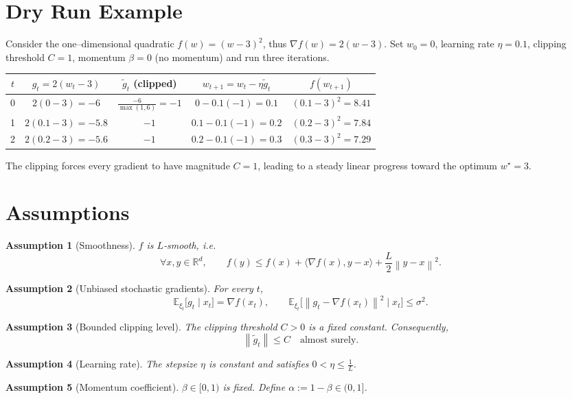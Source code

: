 \documentclass{article}
\newtheorem{assumption}{Assumption}
\newcommand{\EE}{\mathbb{E}}
\newcommand{\norm}[1]{\left\|#1\right\|}
\newcommand{\grad}{\nabla}
\begin{document}
\section*{Dry Run Example}
Consider the one–dimensional quadratic $f(w)=(w-3)^2$, thus $\grad f(w)=2(w-3)$.  
Set $w_0=0$, learning rate $\eta=0.1$, clipping threshold $C=1$, momentum $\beta=0$ (no momentum) and run three iterations.

\begin{center}
\begin{tabular}{c|c|c|c|c}
$t$ & $g_t=2(w_t-3)$ & $\tilde g_t$ (clipped) & $w_{t+1}=w_t-\eta\tilde g_t$ & $f(w_{t+1})$\\\hline
0 & $2(0-3)=-6$ & $\displaystyle\frac{-6}{\max(1,6)}=-1$ & $0-0.1(-1)=0.1$ & $(0.1-3)^2=8.41$\\
1 & $2(0.1-3)=-5.8$ & $-1$ & $0.1-0.1(-1)=0.2$ & $(0.2-3)^2=7.84$\\
2 & $2(0.2-3)=-5.6$ & $-1$ & $0.2-0.1(-1)=0.3$ & $(0.3-3)^2=7.29$
\end{tabular}
\end{center}
The clipping forces every gradient to have magnitude $C=1$, leading to a steady linear progress toward the optimum $w^\star=3$.

\newpage
\section*{Assumptions}
\begin{assumption}[Smoothness]\label{ass:smooth}
$f$ is $L$‑smooth, i.e.
\[
    \forall x,y\in\mathbb{R}^d,\qquad
    f(y)\le f(x)+\langle\grad f(x),y-x\rangle+\frac{L}{2}\norm{y-x}^2 .
\]
\end{assumption}
\begin{assumption}[Unbiased stochastic gradients]\label{ass:unbiased}
For every $t$,
\[
    \EE_{\xi_t}\!\bigl[g_t\mid x_t\bigr]=\grad f(x_t),\qquad 
    \EE_{\xi_t}\!\bigl[\norm{g_t-\grad f(x_t)}^2\mid x_t\bigr]\le\sigma^2 .
\]
\end{assumption}
\begin{assumption}[Bounded clipping level]\label{ass:clip}
The clipping threshold $C>0$ is a fixed constant. Consequently,
\[
    \norm{\tilde g_t}\le C\quad\text{almost surely.}
\]
\end{assumption}
\begin{assumption}[Learning rate]\label{ass:lr}
The stepsize $\eta$ is constant and satisfies $0<\eta\le \frac{1}{L}$.
\end{assumption}
\begin{assumption}[Momentum coefficient]\label{ass:beta}
$\beta\in[0,1)$ is fixed. Define $\alpha:=1-\beta\in(0,1]$.
\end{assumption}
\end{document}

